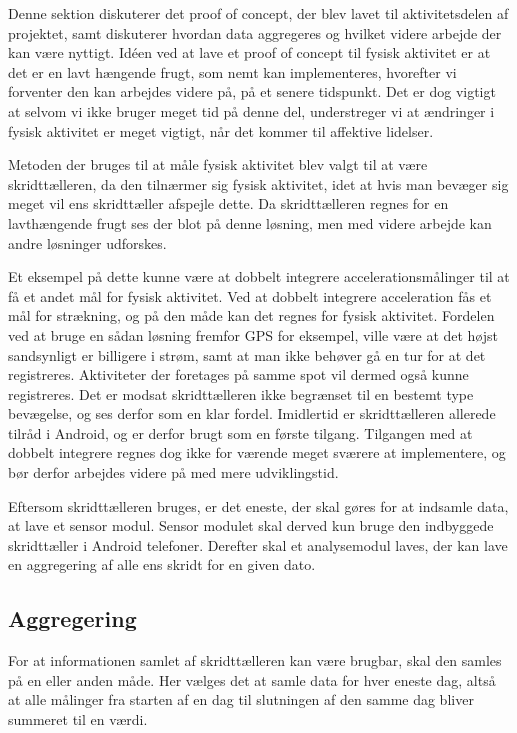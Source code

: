 Denne sektion diskuterer det proof of concept, der blev lavet til aktivitetsdelen af projektet, samt diskuterer hvordan data aggregeres og hvilket videre arbejde der kan være nyttigt. 
Idéen ved at lave et proof of concept til fysisk aktivitet er at det er en lavt hængende frugt, som nemt kan implementeres, hvorefter vi forventer den kan arbejdes videre på, på et senere tidspunkt. 
Det er dog vigtigt at selvom vi ikke bruger meget tid på denne del, understreger vi at ændringer i fysisk aktivitet er meget vigtigt, når det kommer til affektive lidelser. 

Metoden der bruges til at måle fysisk aktivitet blev valgt til at være skridttælleren, da den tilnærmer sig fysisk aktivitet, idet at hvis man bevæger sig meget vil ens skridttæller afspejle dette.
Da skridttælleren regnes for en lavthængende frugt ses der blot på denne løsning, men med videre arbejde kan andre løsninger udforskes.

Et eksempel på dette kunne være at dobbelt integrere accelerationsmålinger til at få et andet mål for fysisk aktivitet.
Ved at dobbelt integrere acceleration fås et mål for strækning, og på den måde kan det regnes for fysisk aktivitet.
Fordelen ved at bruge en sådan løsning fremfor GPS for eksempel, ville være at det højst sandsynligt er billigere i strøm, samt at man ikke behøver gå en tur for at det registreres. Aktiviteter der foretages på samme spot vil dermed også kunne registreres.
Det er modsat skridttælleren ikke begrænset til en bestemt type bevægelse, og ses derfor som en klar fordel.
Imidlertid er skridttælleren allerede tilråd i Android, og er derfor brugt som en første tilgang.
Tilgangen med at dobbelt integrere regnes dog ikke for værende meget sværere at implementere, og bør derfor arbejdes videre på med mere udviklingstid.

Eftersom skridttælleren bruges, er det eneste, der skal gøres for at indsamle data, at lave et sensor modul.
Sensor modulet skal derved kun bruge den indbyggede skridttæller i Android telefoner.
Derefter skal et analysemodul laves, der kan lave en aggregering af alle ens skridt for en given dato.

\subsection{Aggregering}
For at informationen samlet af skridttælleren kan være brugbar, skal den samles på en eller anden måde.
Her vælges det at samle data for hver eneste dag, altså at alle målinger fra starten af en dag til slutningen af den samme dag bliver summeret til en værdi.

